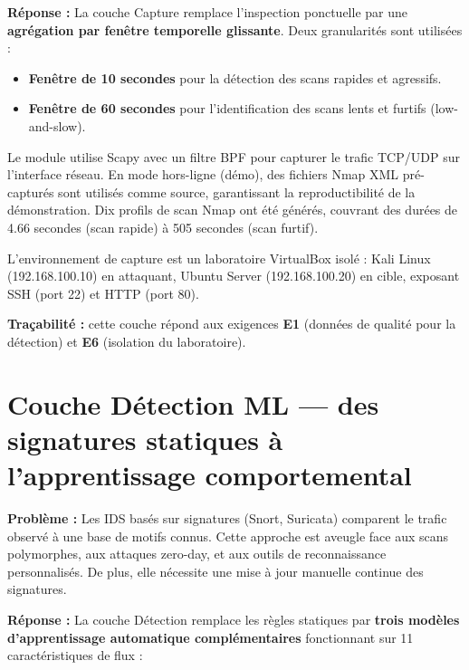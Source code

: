\documentclass[12pt,a4paper]{article}
\newcommand{\problem}{\textcolor{accentred}{\textbf{Probl\`{e}me : }}}
\newcommand{\answer}{\textcolor{accentgreen}{\textbf{R\'{e}ponse : }}}
\begin{document}
\answer La couche Capture remplace l'inspection ponctuelle par une
\textbf{agr\'{e}gation par fen\^{e}tre temporelle glissante}. Deux granularit\'{e}s
sont utilis\'{e}es :

\begin{itemize}[nosep,leftmargin=1.5em]
  \item \textbf{Fen\^{e}tre de 10 secondes} pour la d\'{e}tection des scans rapides
        et agressifs.
  \item \textbf{Fen\^{e}tre de 60 secondes} pour l'identification des scans lents
        et furtifs (low-and-slow).
\end{itemize}

\noindent Le module utilise Scapy avec un filtre BPF pour capturer le trafic
TCP/UDP sur l'interface r\'{e}seau. En mode hors-ligne (d\'{e}mo), des fichiers
Nmap XML pr\'{e}-captur\'{e}s sont utilis\'{e}s comme source, garantissant la
reproductibilit\'{e} de la d\'{e}monstration. Dix profils de scan Nmap ont
\'{e}t\'{e} g\'{e}n\'{e}r\'{e}s, couvrant des dur\'{e}es de 4.66 secondes
(scan rapide) \`{a} 505 secondes (scan furtif).

L'environnement de capture est un laboratoire VirtualBox isol\'{e} :
Kali Linux (192.168.100.10) en attaquant, Ubuntu Server (192.168.100.20)
en cible, exposant SSH (port 22) et HTTP (port 80).

\bigskip
\noindent \textbf{Tra\c{c}abilit\'{e} :} cette couche r\'{e}pond aux exigences
\textbf{E1} (donn\'{e}es de qualit\'{e} pour la d\'{e}tection) et
\textbf{E6} (isolation du laboratoire).

\section{Couche D\'{e}tection ML --- des signatures statiques \`{a} l'apprentissage comportemental}

\problem Les IDS bas\'{e}s sur signatures (Snort, Suricata) comparent le trafic
observ\'{e} \`{a} une base de motifs connus. Cette approche est aveugle face aux
scans polymorphes, aux attaques zero-day, et aux outils de reconnaissance
personnalis\'{e}s. De plus, elle n\'{e}cessite une mise \`{a} jour manuelle
continue des signatures.

\answer La couche D\'{e}tection remplace les r\`{e}gles statiques par
\textbf{trois mod\`{e}les d'apprentissage automatique compl\'{e}mentaires}
fonctionnant sur 11 caract\'{e}ristiques de flux :
\end{document}
